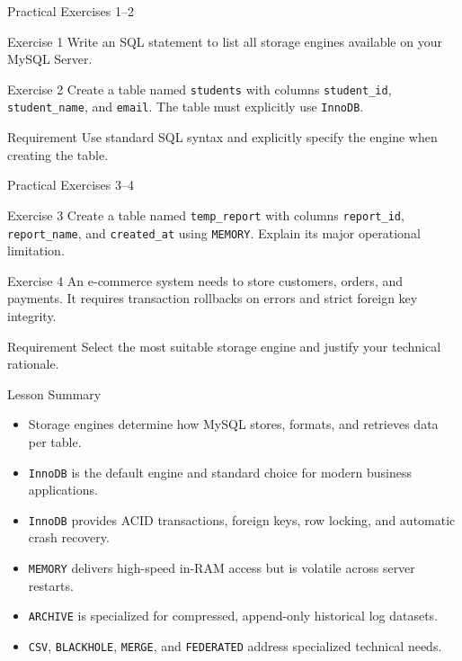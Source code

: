 \documentclass[aspectratio=169,11pt]{beamer}
\newcommand{\code}[1]{\texttt{#1}}
\newcommand{\smallitem}{\setlength{\itemsep}{2pt}}
\begin{document}
\begin{frame}{Practical Exercises 1--2}
\begin{block}{Exercise 1}
Write an SQL statement to list all storage engines available on your MySQL Server.
\end{block}
\begin{block}{Exercise 2}
Create a table named \code{students} with columns \code{student\_id}, \code{student\_name}, and \code{email}. The table must explicitly use \code{InnoDB}.
\end{block}
\begin{alertblock}{Requirement}
Use standard SQL syntax and explicitly specify the engine when creating the table.
\end{alertblock}
\end{frame}

\begin{frame}{Practical Exercises 3--4}
\begin{block}{Exercise 3}
Create a table named \code{temp\_report} with columns \code{report\_id}, \code{report\_name}, and \code{created\_at} using \code{MEMORY}. Explain its major operational limitation.
\end{block}
\begin{block}{Exercise 4}
An e-commerce system needs to store customers, orders, and payments. It requires transaction rollbacks on errors and strict foreign key integrity.
\end{block}
\begin{alertblock}{Requirement}
Select the most suitable storage engine and justify your technical rationale.
\end{alertblock}
\end{frame}

\begin{frame}{Lesson Summary}
\begin{itemize}\smallitem
  \item Storage engines determine how MySQL stores, formats, and retrieves data per table.
  \item \code{InnoDB} is the default engine and standard choice for modern business applications.
  \item \code{InnoDB} provides ACID transactions, foreign keys, row locking, and automatic crash recovery.
  \item \code{MEMORY} delivers high-speed in-RAM access but is volatile across server restarts.
  \item \code{ARCHIVE} is specialized for compressed, append-only historical log datasets.
  \item \code{CSV}, \code{BLACKHOLE}, \code{MERGE}, and \code{FEDERATED} address specialized technical needs.
\end{itemize}
\end{frame}
\end{document}
